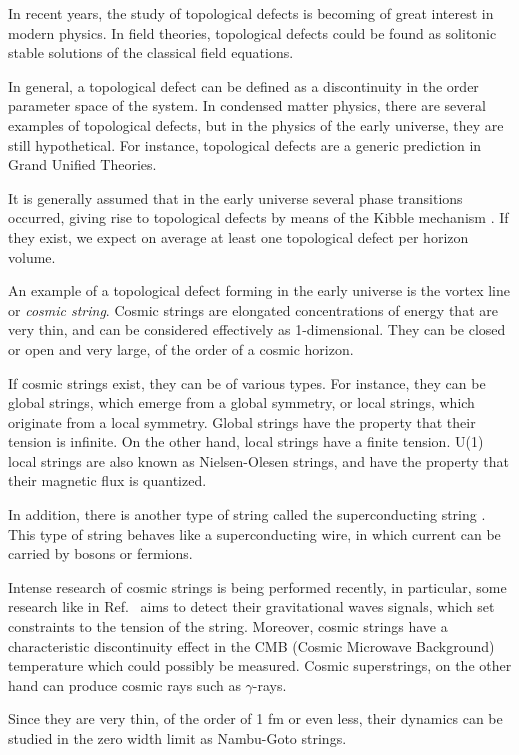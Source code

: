 In recent years, the study of topological defects is becoming of great interest in modern physics. In field theories, topological defects could be found as solitonic stable solutions of the classical field equations.

In general, a topological defect can be defined as a discontinuity in the order parameter space of the system. In condensed matter physics, there are several examples of topological defects, but in the physics of the early universe, they are still hypothetical. For instance, topological defects are a generic prediction in Grand Unified Theories.

It is generally assumed that in the early universe several phase transitions occurred, giving rise to topological defects by means of the Kibble mechanism \cite{Kibble1976,Kibble1980}. If they exist, we expect on average at least one topological defect per horizon volume.

An example of a topological defect forming in the early universe is the vortex line or \emph{cosmic string}. Cosmic strings are elongated concentrations of energy that are very thin, and can be considered effectively as 1-dimensional. They can be closed or open and very large, of the order of a cosmic horizon.

If cosmic strings exist, they can be of various types. For instance, they can be global strings, which emerge from a global symmetry, or local strings, which originate from a local symmetry. Global strings have the property that their tension is infinite. On the other hand, local strings have a finite tension. U(1) local strings are also known as Nielsen-Olesen strings, and have the property that their magnetic flux is quantized. 

In addition, there is another type of string called the superconducting string \cite{WITTEN1985557}. This type of string behaves like a superconducting wire, in which current can be carried by bosons or fermions.


Intense research of cosmic strings is being performed recently, in particular, some research like in Ref.\ \cite{PhysRevD.97.102002} aims to detect their gravitational waves signals, which set constraints to the tension of the string. Moreover, cosmic strings have a characteristic discontinuity effect in the CMB (Cosmic Microwave Background) temperature which could possibly be measured. Cosmic super\-strings, on the other hand can produce cosmic rays such as $\gamma$-rays.

Since they are very thin, of the order of 1 fm or even less, their dynamics  can be studied in the zero width limit as Nambu-Goto strings. 

